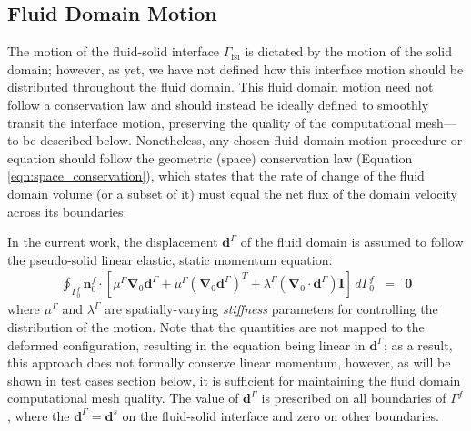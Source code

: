 \documentclass[sn-mathphys,Numbered]{sn-jnl}%
\newcommand{\bb}{\boldsymbol}
\begin{document}
\subsection{Fluid Domain Motion} \label{sec:fluid_domain_motion}
The motion of the fluid-solid interface $\Gamma_\text{fsi}$ is dictated by the motion of the solid domain; however, as yet, we have not defined how this interface motion should be distributed throughout the fluid domain.
This fluid domain motion need not follow a conservation law and should instead be ideally defined to smoothly transit the interface motion, preserving the quality of the computational mesh—to be described below.
Nonetheless, any chosen fluid domain motion procedure or equation should follow the geometric (space) conservation law (Equation \ref{eqn:space_conservation}), 
which states that the rate of change of the fluid domain volume (or a subset of it) must equal the net flux of the domain velocity across its boundaries.

In the current work, the displacement $\bb{d}^\Gamma$ of the fluid domain is assumed to follow the pseudo-solid linear elastic, static momentum equation:
\begin{eqnarray} \label{eqn:motion_momentum}
    \oint_{\Gamma_0^f} \bb{n}_0^f \cdot
    \left[
    \mu^\Gamma \bb{\nabla}_0 \bb{d}^\Gamma + \mu^\Gamma \left(\bb{\nabla}_0 \bb{d}^\Gamma\right)^T
    + \lambda^\Gamma (\bb{\nabla}_0 \cdot \bb{d}^\Gamma) \textbf{I}
    \right]
    \, d\Gamma_0^f
    &=& \bb{0}
\end{eqnarray}
where $\mu^\Gamma$ and $\lambda^\Gamma$ are spatially-varying \emph{stiffness} parameters for controlling the distribution of the motion.
Note that the quantities are not mapped to the deformed configuration, resulting in the equation being linear in $\bb{d}^\Gamma$; as a result, this approach does not formally conserve linear momentum, however, as will be shown in test cases section below, it is sufficient for maintaining the fluid domain computational mesh quality.
The value of $\bb{d}^\Gamma$ is prescribed on all boundaries of $\Gamma^f$, where the $\bb{d}^\Gamma = \bb{d}^s$ on the fluid-solid interface and zero on other boundaries.
\end{document}
